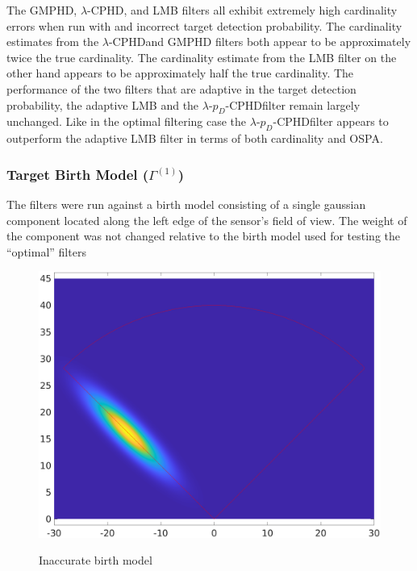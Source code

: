 \documentclass{article}
\newcommand{\lcphd}{$\lambda$-CPHD}
\newcommand{\lpdcphd}{$\lambda$-$p_D$-CPHD}
\begin{document}
The GMPHD, $\lambda$-CPHD, and LMB filters all exhibit extremely high cardinality errors when run with and incorrect target detection probability. The cardinality estimates from the \lcphd and GMPHD filters both appear to be approximately twice the true cardinality. The cardinality estimate from the LMB filter on the other hand appears to be approximately half the true cardinality. The performance of the two filters that are adaptive in the target detection probability, the adaptive LMB and the \lpdcphd filter remain largely unchanged. Like in the optimal filtering case the \lpdcphd filter appears to outperform the adaptive LMB filter in terms of both cardinality and OSPA.

\subsubsection{Target Birth Model ($\Gamma^{(1)}$)}
The filters were run against a birth model consisting of a single gaussian component located along the left edge of the sensor's field of view. The weight of the component was not changed relative to the birth model used for testing the ``optimal'' filters
\begin{figure}[H]
  \centering
  \includegraphics[width=.75\linewidth]{bad_birth/bm.png}
  \label{fig:birth_model}
  \caption{Inaccurate birth model}
\end{figure}
\end{document}
